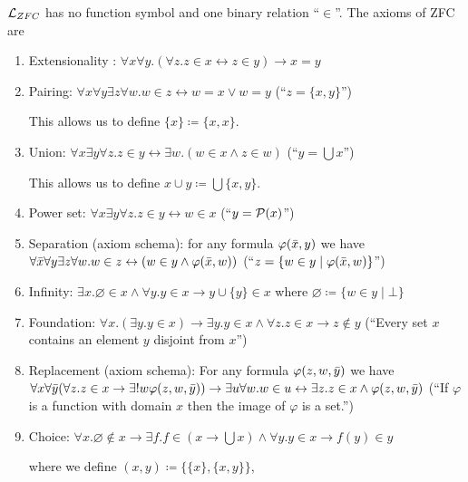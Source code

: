 \begin{boxdef}
\begin{defi}
    \alert{$\mathcal{L}_{ZFC}$} has no function symbol and one binary relation ``$\in$''. 
    The axioms of ZFC are
    \begin{enumerate}
        \item Extensionality : $\forall x \forall y. (\forall z. z \in x \leftrightarrow z \in y) \to x = y$
        \item Pairing: $\forall x \forall y \exists z \forall w. w \in z \leftrightarrow w = x \lor w = y$ (``$z = \{x,y\}$'')
        
        This allows us to define $\{x\} \coloneq \{x, x\}$.
        \item Union: $\forall x \exists y \forall z. z \in y \leftrightarrow \exists w. (w \in x \wedge z \in w)$ (``$y = \bigcup x$'')
        
        This allows us to define $x \cup y \coloneq \bigcup \{x, y\}$.
        \item Power set: $\forall x \exists y \forall z. z \in y \leftrightarrow w \in x$ (``$y = \mathcal{P}(x)$'')
        \item Separation (axiom schema): for any formula $\varphi(\bar{x}, y)$ we have $\forall \bar{x} \forall y \exists z \forall w. w \in z \leftrightarrow (w \in y \wedge \varphi(\bar{x}, w))$ (``$z = \{ w \in y \mid \varphi(\bar{x}, w)\}$'')
        \item Infinity: $\exists x. \varnothing \in x \wedge \forall y. y \in x \to y \cup \{y\} \in x$ where $\varnothing \coloneq \{w \in y \mid \bot\}$
        \item Foundation: $\forall x. (\exists y. y \in x) \to \exists y. y \in x \wedge \forall z. z \in x \to z \notin y$ (``Every set $x$ contains an element $y$ disjoint from $x$'')
        \item Replacement (axiom schema): For any formula $\varphi(z, w, \bar{y})$ we have $\forall x \forall \bar{y} (\forall z. z \in x \to \exists! w \varphi(z, w, \bar{y})) \to \exists u \forall w. w \in u \leftrightarrow \exists z. z \in x \wedge \varphi(z, w, \bar{y})$ (``If $\varphi$ is a function with domain $x$ then the image of $\varphi$ is a set.'')
        \item Choice: $\forall x. \varnothing \notin x \to \exists f. f \in (x \to \bigcup x) \wedge \forall y. y \in x  \to f(y) \in y$
        
        where we define $(x , y) \coloneq \{\{x\}, \{x, y\}\}$, 
        

\end{enumerate}
\end{defi}
\end{boxdef}
